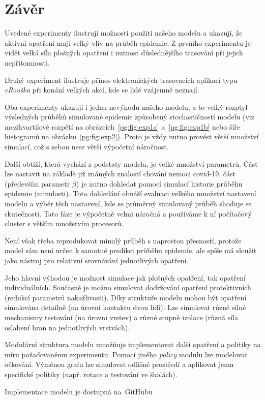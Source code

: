 \section*{Závěr}

Uvedené experimenty ilustrují možnosti použití našeho modelu a
ukazují, že aktivní opatření mají velký vliv na průběh epidemie. Z
prvního experimentu je vidět velká síla plošných opatření i nutnost
důslednějšího trasování při jejich nepřítomnosti.

Druhý experiment ilustruje přínos elektronických trasovacích aplikací
typu {\em eRouška} při konání velkých akcí, kde se lidé vzájemně
neznají.

Oba experimenty ukazují i jednu nevýhodu našeho modelu, a to velký rozptyl 
výsledných průběhů simulované epidemie způsobený stochastičností modelu (viz mezikvartilové rozpětí na
obrázcích~\ref{pg:fig:exp1a} a~\ref{pg:fig:exp1b} nebo šíře histogramů
na obrázku~\ref{pg:fig:exp2}). Proto je vždy nutno provést větší množství
simulací, což s sebou nese větší výpočetní náročnost.

Další obtíží, která vychází z podstaty modelu, je velké množství parametrů. Část lze nastavit na základě
již známých znalostí chování nemoci covid-19, část (především parametr $\beta$) je nutno dohledat pomocí simulací historie průběhu epidemie (minulosti). Toto dohledání obnáší evaluaci velkého množství nastavení modelu a výběr těch nastavení, kde se průměrný simulovaný průběh shoduje se skutečností. Tato fáze je výpočetně velmi náročná a používáme k ní počítačový cluster s větším množstvím procesorů. 

Není však třeba reprodukovat minulý průběh s naprostou přesností, protože model sám není určen k samotné predikci průběhu epidemie, ale spíše má sloužit jako nástroj pro relativní srovnávání jednotlivých opatření. 

Jeho hlavní výhodou je možnost simulace jak plošných opatření, tak
opatření individuálních. Současně je možno simulovat dodržování
opatření protektivních (redukcí parametrů nakažlivosti). Díky
struktuře modelu mohou být opatření simulována detailně (na úrovni
kontaktu dvou lidí). Lze simulovat různě silné mechanismy testování
(na úrovni vrstev) a různé stupně izolace (různá síla oslabení hran
na jednotlivých vrstvách).


Modulární struktura modelu umožňuje implementovat další opatření a
politiky na míru požadovanému experimentu. Pomocí jiného {\em policy}
modulu lze modelovat očkování. Výměnou grafu lze simulovat odlišné
prostředí a aplikovat jemu specifické politiky (např. rotace a testování
ve školách).

Implementace modelu je dostupná na~GitHubu~\cite{pg:mmsoft}.